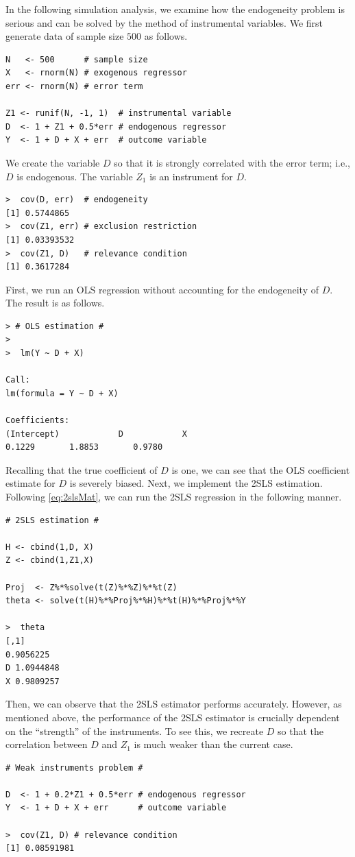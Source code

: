 \documentclass[10.5pt, A4paper, openany, uplatex]{book}
\numberwithin{equation}{section}
\begin{document}
In the following simulation analysis, we examine how the endogeneity problem is serious and can be solved by the method of instrumental variables.
We first generate data of sample size $500$ as follows.
\begin{lstlisting}[basicstyle=\ttfamily\footnotesize, frame=single]
N   <- 500      # sample size
X   <- rnorm(N) # exogenous regressor
err <- rnorm(N) # error term

Z1 <- runif(N, -1, 1)  # instrumental variable
D  <- 1 + Z1 + 0.5*err # endogenous regressor
Y  <- 1 + D + X + err  # outcome variable
\end{lstlisting}
We create the variable $D$ so that it is strongly correlated with the error term; i.e., $D$ is endogenous.
The variable $Z_1$ is an instrument for $D$.
\begin{lstlisting}[basicstyle=\ttfamily\footnotesize, frame=single]
>  cov(D, err)  # endogeneity
[1] 0.5744865
>  cov(Z1, err) # exclusion restriction
[1] 0.03393532
>  cov(Z1, D)   # relevance condition
[1] 0.3617284
\end{lstlisting}
First, we run an OLS regression without accounting for the endogeneity of $D$.
The result is as follows.
\begin{lstlisting}[basicstyle=\ttfamily\footnotesize, frame=single]
> # OLS estimation #
> 
>  lm(Y ~ D + X)

Call:
lm(formula = Y ~ D + X)

Coefficients:
(Intercept)            D            X  
0.1229       1.8853       0.9780  
\end{lstlisting}
Recalling that the true coefficient of $D$ is one, we can see that the OLS coefficient estimate for $D$ is severely biased.
Next, we implement the 2SLS estimation.
Following \eqref{eq:2slsMat}, we can run the 2SLS regression in the following manner. 
\begin{lstlisting}[basicstyle=\ttfamily\footnotesize, frame=single]
# 2SLS estimation #

H <- cbind(1,D, X)
Z <- cbind(1,Z1,X)

Proj  <- Z%*%solve(t(Z)%*%Z)%*%t(Z)
theta <- solve(t(H)%*%Proj%*%H)%*%t(H)%*%Proj%*%Y

>  theta
[,1]
0.9056225
D 1.0944848
X 0.9809257
\end{lstlisting}
Then, we can observe that the 2SLS estimator performs accurately.
However, as mentioned above, the performance of the 2SLS estimator is crucially dependent on the ``strength'' of the instruments.
To see this, we recreate $D$ so that the correlation between $D$ and $Z_1$ is much weaker than the current case.
\begin{lstlisting}[basicstyle=\ttfamily\footnotesize, frame=single]
# Weak instruments problem #

D  <- 1 + 0.2*Z1 + 0.5*err # endogenous regressor
Y  <- 1 + D + X + err      # outcome variable

>  cov(Z1, D) # relevance condition
[1] 0.08591981
\end{lstlisting}
\end{document}
